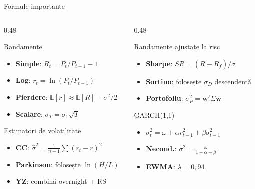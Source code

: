 \documentclass[9pt, aspectratio=169, t]{beamer}
\theoremstyle{definition}
\newcommand{\E}{\mathbb{E}}
\begin{document}
\begin{frame}{Formule importante}
    \begin{columns}[T]
        \begin{column}{0.48\textwidth}
        {\small
        \begin{block}{Randamente}
            \begin{itemize}
                \item \textbf{Simple}: $R_t = P_t/P_{t-1} - 1$
                \item \textbf{Log}: $r_t = \ln(P_t/P_{t-1})$
                \item \textbf{Pierdere}: $\E[r] \approx \E[R] - \sigma^2/2$
                \item \textbf{Scalare}: $\sigma_T = \sigma_1\sqrt{T}$
            \end{itemize}
        \end{block}
        \begin{alertblock}{Estimatori de volatilitate}
            \begin{itemize}
                \item \textbf{CC}: $\hat\sigma^2 = \frac{1}{n-1}\sum (r_t - \bar{r})^2$
                \item \textbf{Parkinson}: folosește $\ln(H/L)$
                \item \textbf{YZ}: combină overnight + RS
            \end{itemize}
        \end{alertblock}
        }
        \end{column}
        \begin{column}{0.48\textwidth}
        {\small
        \begin{exampleblock}{Randamente ajustate la risc}
            \begin{itemize}
                \item \textbf{Sharpe}: $SR = (\bar{R} - R_f)/\sigma$
                \item \textbf{Sortino}: folosește $\sigma_D$ descendentă
                \item \textbf{Portofoliu}: $\sigma_P^2 = \mathbf{w}'\Sigma\mathbf{w}$
            \end{itemize}
        \end{exampleblock}
        \begin{block}{GARCH(1,1)}
            \begin{itemize}
                \item $\sigma_t^2 = \omega + \alpha r_{t-1}^2 + \beta\sigma_{t-1}^2$
                \item \textbf{Necond.}: $\bar\sigma^2 = \frac{\omega}{1-\alpha-\beta}$
                \item \textbf{EWMA}: $\lambda = 0{,}94$
            \end{itemize}
        \end{block}
        }
        \end{column}
    \end{columns}
\end{frame}
\end{document}
